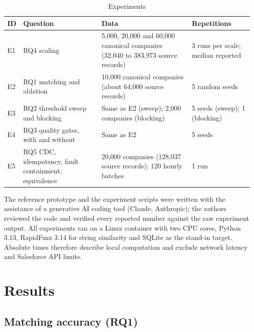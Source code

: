 \begin{table}[htbp]
\centering
\caption{Experiments}
\label{tab:3}
\setlength{\tabcolsep}{4pt}
\renewcommand{\arraystretch}{1.15}
\footnotesize
\begin{tabular}{>{\raggedright\arraybackslash\hspace{0pt}}p{}>{\raggedright\arraybackslash\hspace{0pt}}p{}>{\raggedright\arraybackslash\hspace{0pt}}p{}>{\raggedright\arraybackslash\hspace{0pt}}p{}}
\hline
\textbf{ID} & \textbf{Question} & \textbf{Data} & \textbf{Repetitions} \\
\hline
E1 & RQ4 scaling & 5,000, 20,000 and 60,000 canonical companies (32,040 to 383,973 source records) & 3 runs per scale; median reported \\
E2 & RQ1 matching and ablation & 10,000 canonical companies (about 64,000 source records) & 5 random seeds \\
E3 & RQ2 threshold sweep and blocking & Same as E2 (sweep); 2,000 companies (blocking) & 5 seeds (sweep); 1 (blocking) \\
E4 & RQ3 quality gates, with and without & Same as E2 & 5 seeds \\
E5 & RQ5 CDC, idempotency, fault containment, equivalence & 20,000 companies (128,037 source records); 120 hourly batches & 1 run \\
\hline
\end{tabular}
\end{table}


The reference prototype and the experiment scripts were written with the assistance of a generative AI coding tool (Claude, Anthropic); the authors reviewed the code and verified every reported number against the raw experiment output. All experiments ran on a Linux container with two CPU cores, Python 3.13, RapidFuzz 3.14 for string similarity and SQLite as the stand-in target. Absolute times therefore describe local computation and exclude network latency and Salesforce API limits.

\section{Results}\label{sec:5}

\subsection{Matching accuracy (RQ1)}\label{sec:5.1}

